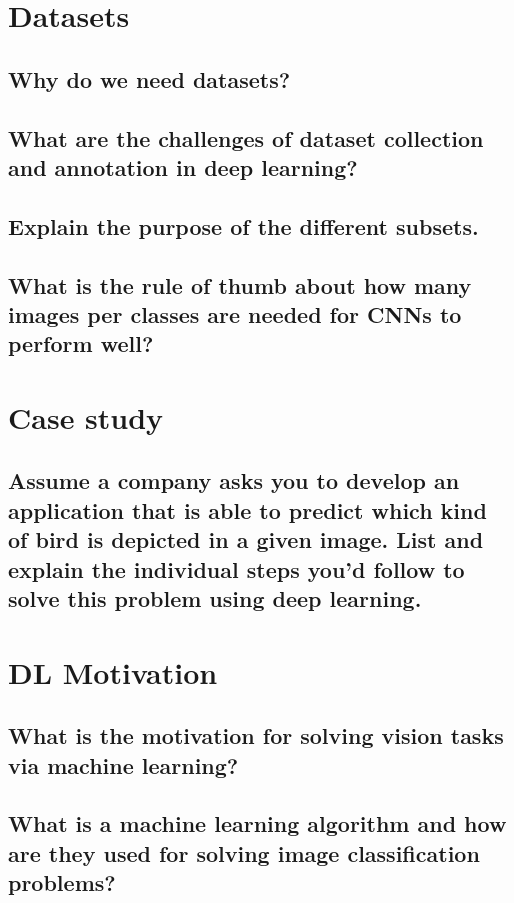 \section{Datasets}

\subsection{Why do we need datasets?}

\subsection{What are the challenges of dataset collection and annotation in deep learning?}

\subsection{Explain the purpose of the different subsets.}

\subsection{What is the rule of thumb about how many images per classes are needed for CNNs to perform well?}

\section{Case study}

\subsection{Assume a company asks you to develop an application that is able to predict which kind of bird is depicted in a given image. List and explain the individual steps you’d follow to solve this problem using deep learning.}

\section{DL Motivation}

\subsection{What is the motivation for solving vision tasks via machine learning?}

\subsection{What is a machine learning algorithm and how are they used for solving image classification problems?}

